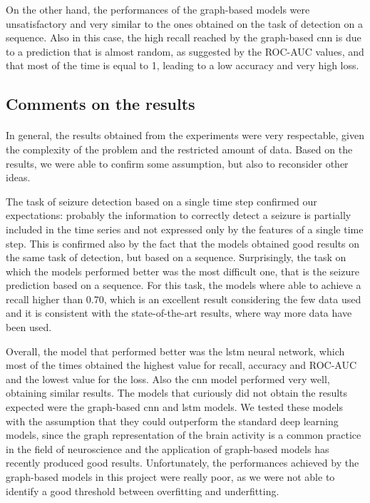 On the other hand, the performances of the graph-based models were unsatisfactory and very similar to the ones obtained on the task of detection on a sequence. Also in this case, the high recall reached by the graph-based \acs{cnn} is due to a prediction that is almost random, as suggested by the ROC-AUC values, and that most of the time is equal to 1, leading to a low accuracy and very high loss.


\subsection{Comments on the results}
\paragraph{} In general, the results obtained from the experiments were very respectable, given the complexity of the problem and the restricted amount of data. Based on the results, we were able to confirm some assumption, but also to reconsider other ideas.

The task of seizure detection based on a single time step confirmed our expectations: probably the information to correctly detect a seizure is partially included in the time series and not expressed only by the features of a single time step. This is confirmed also by the fact that the models obtained good results on the same task of detection, but based on a sequence. Surprisingly, the task on which the models performed better was the most difficult one, that is the seizure prediction based on a sequence. For this task, the models where able to achieve a recall higher than 0.70, which is an excellent result considering the few data used and it is consistent with the state-of-the-art results, where way more data have been used. 

Overall, the model that performed better was the \acs{lstm} neural network, which most of the times obtained the highest value for recall, accuracy and ROC-AUC and the lowest value for the loss. Also the \acs{cnn} model performed very well, obtaining similar results. The models that curiously did not obtain the results expected were the graph-based \acs{cnn} and \acs{lstm} models. We tested these models with the assumption that they could outperform the standard deep learning models, since the graph representation of the brain activity is a common practice in the field of neuroscience and the application of graph-based models has recently produced good results. Unfortunately, the performances achieved by the graph-based models in this project were really poor, as we were not able to identify a good threshold between overfitting and underfitting.

